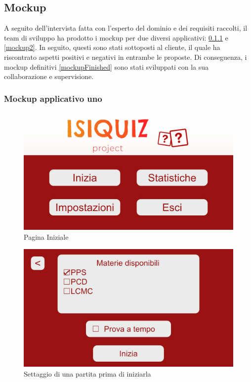         \subsection{Mockup}
    	A seguito dell'intervista fatta con l'esperto del dominio e dei requisiti raccolti, il team di sviluppo ha prodotto i mockup per due diversi applicativi: \ref{mockup1} e \ref{mockup2}. In seguito, questi sono stati sottoposti al cliente, il quale ha riscontrato aspetti positivi e negativi in entrambe le proposte. Di conseguenza, i mockup definitivi \ref{mockupFinished} sono stati sviluppati con la sua collaborazione e supervisione.

        \subsubsection{Mockup applicativo uno}\label{mockup1}
    	\begin{figure}[H]
            \centering
            \includegraphics[width=\textwidth]{Images/mockup/home1.jpg}
            \caption{Pagina Iniziale}
            \label{fig:HomePage1}
        \end{figure}
        
        \begin{figure}[H]
            \centering
            \includegraphics[width=\textwidth]{Images/mockup/start1.jpg}
            \caption{Settaggio di una partita prima di iniziarla}
            \label{fig:Start1}
        \end{figure}
          
